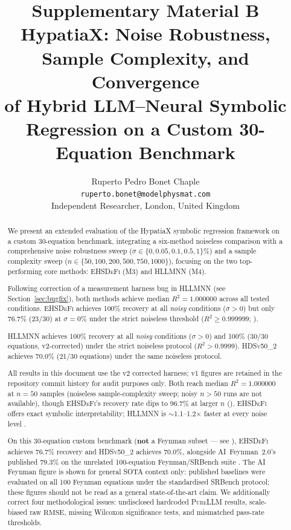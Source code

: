 \documentclass[twoside,11pt]{article}
\newcommand{\PureLLM}{\textsc{PureLLM}}
\newcommand{\EHD}{\textsc{EHSDeFi}}
\newcommand{\HSL}{\textsc{HLLMNN}}
\newcommand{\HDS}{\textsc{HDSv50\_2}}
\newcommand{\Rsq}{R^{2}}
\newcommand{\rmse}{\ensuremath{\mathrm{RMSE}}}
\begin{document}
\title{%
  Supplementary Material B\\[6pt]
  HypatiaX: Noise Robustness, Sample Complexity, and Convergence\\
  of Hybrid LLM--Neural Symbolic Regression on a Custom 30-Equation Benchmark
}
\author{Ruperto Pedro Bonet Chaple\\
  \texttt{ruperto.bonet@modelphysmat.com}\\
  Independent Researcher, London, United Kingdom
}
\editor{}
\maketitle

\begin{abstract}
We present an extended evaluation of the HypatiaX symbolic regression
framework on a custom 30-equation benchmark, integrating a six-method
noiseless comparison with a comprehensive noise robustness sweep
($\sigma \in \{0, 0.05, 0.1, 0.5, 1\}\%$) and a
sample complexity sweep
($n \in \{50, 100, 200, 500, 750, 1000\}$), focusing on the two
top-performing core methods: \EHD{} (M3) and \HSL{} (M4).

Following correction of a measurement harness bug in \HSL{} (see
Section~\ref{sec:bugfix}), both methods achieve median $\Rsq = 1.000000$
across all tested conditions.
\EHD{} achieves 100\% recovery at all \emph{noisy} conditions ($\sigma > 0$)
but only 76.7\% (23/30) at $\sigma=0\%$ under the strict noiseless
threshold ($\Rsq \geq 0.999999$; ).

\HSL{} achieves 100\% recovery at all \emph{noisy} conditions ($\sigma > 0$)
and 100\% (30/30 equations, v2-corrected) under the strict noiseless protocol
($\Rsq > 0.9999$). \HDS{} achieves 70.0\% (21/30 equations) under the same
noiseless protocol.

All results in this document use the v2 corrected harness; v1 figures are
retained in the repository commit history for audit purposes only.
Both reach median $\Rsq=1.000000$ at $n = 50$ samples (noiseless sample-complexity
sweep; noisy $n>50$ runs are not available), though \EHD's
recovery rate dips to 96.7\% at larger $n$ ().
\EHD{} offers exact symbolic interpretability; \HSL{} is $\sim$1.1--1.2$\times$
faster at every noise level .

On this 30-equation custom benchmark (\textbf{not} a Feynman subset ---
see ), \EHD{} achieves 76.7\% recovery and \HDS{} achieves
70.0\%, alongside AI~Feynman~2.0's published 79.3\% on the unrelated
100-equation Feynman/SRBench suite
.
The AI Feynman figure is shown for general SOTA context only: published
baselines were evaluated on
all 100 Feynman equations under the standardised SRBench protocol; these
figures should not be read as a general state-of-the-art claim.
We additionally correct four methodological issues:
undisclosed hardcoded \PureLLM{} results, scale-biased raw \rmse,
missing Wilcoxon significance tests, and mismatched pass-rate thresholds.
\end{abstract}
\end{document}
